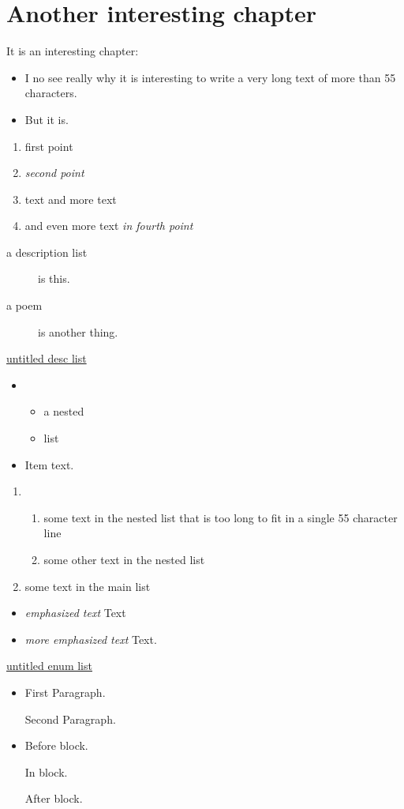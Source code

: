 \chapter{Another interesting chapter}
\label{s:2}
It is an interesting chapter:
\begin{itemize}
\item I no see really why it is interesting to write a very long text of more than
55 characters.
\item But it is.
\end{itemize}
\begin{enumerate}
\item first point
\item \emph{second point}
\item text 
and more text
\item and even more text
\emph{in fourth point}
\end{enumerate}
\hypertarget{label3}{}\begin{description}
\item[a description list] is this.
\item[a poem] is another thing.
\end{description}
\hyperlink{label3}{untitled desc list}
\begin{itemize}
\item \begin{itemize}
\item a nested
\item list
\end{itemize}

\item Item text.
\end{itemize}
\hypertarget{label2}{}\begin{enumerate}
\item \begin{enumerate}
\item some text in the nested list that is too long to fit in a single 55 character line
\item some other text in the nested list
\end{enumerate}

\item some text in the main list
\end{enumerate}
\begin{itemize}
\item \emph{emphasized text}
Text
\item \emph{more emphasized text}
Text.
\end{itemize}
\hyperlink{label2}{untitled enum list}
\begin{itemize}
\item First Paragraph.

Second Paragraph.
\item Before block.

In block.

After block.
\end{itemize}
